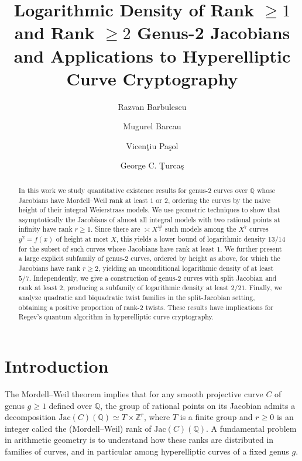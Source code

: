 \documentclass{amsart}
\title[Logarithmic Density of Positive-Rank Genus-2 Jacobians]{Logarithmic Density of Rank $\geq 1$ and Rank $\geq 2$ Genus-2 Jacobians and Applications to Hyperelliptic Curve Cryptography}
\author[R. Barbulescu]{Razvan Barbulescu}
\author[M. Barcau \and V. Pa\c sol]{Mugurel Barcau \and
Vicen\c tiu Pa\c sol}
\author[G. C. \c Turca\c s]{George C. \c Turca\c s}
\newcommand{\Q}{{\mathbb Q}}
\newcommand{\Jac}{\mathrm{Jac}}
\begin{document}
             




\begin{abstract} In this work we study quantitative existence results for genus-$2$ curves over $\Q$ whose Jacobians have Mordell--Weil rank at least $1$ or $2$, ordering the curves by the naive height of their integral Weierstrass models. We use geometric techniques to show that asymptotically the Jacobians of almost all integral models with two rational points at infinity have rank $r \geq 1$. Since there are $\asymp X^{\frac{13}{2}}$ such models among the $X^7$ curves $y^2=f(x)$ of height at most $X$, this yields a lower bound of logarithmic density $13/14$ for the subset of such curves whose Jacobians have rank at least $1$. We further present a large explicit subfamily of genus-$2$ curves, ordered by height as above, for which the Jacobians have rank $r \geq 2$, yielding an unconditional logarithmic density of at least $5/7$.  Independently, we give a construction of genus-$2$ curves with split Jacobian and rank at least $2$, producing a subfamily of logarithmic density at least $2/21$. Finally, we analyze quadratic and biquadratic twist families in the split-Jacobian setting, obtaining a positive proportion of rank-$2$ twists. These results have implications for Regev's quantum algorithm in hyperelliptic curve cryptography.
 \end{abstract}

\maketitle %




\section{Introduction}



The Mordell--Weil theorem implies that for any smooth projective curve $C$ of genus $g \geq 1$ defined over $\Q$, the group of rational points on its Jacobian admits a decomposition $\Jac(C)(\Q) \simeq T \times \mathbb Z^{r}$, where $T$ is a finite group and $r \geq 0$ is an integer called the (Mordell--Weil) rank of $\Jac(C)(\Q)$. A fundamental problem in arithmetic geometry is to understand how these ranks are distributed in families of curves, and in particular among hyperelliptic curves of a fixed genus $g$. 
\end{document}
